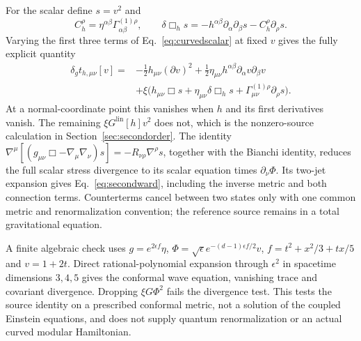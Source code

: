 \documentclass[12pt]{article}
\theoremstyle{definition}
\theoremstyle{remark}
\newcommand{\Glin}{G^{\mathrm{lin}}}
\begin{document}
For the scalar define $s=v^2$ and
\[
 C_h^\rho=\eta^{\alpha\beta}\Gamma^{(1)\rho}_{\alpha\beta},\qquad
 \delta\Box_h s=-h^{\alpha\beta}\partial_\alpha\partial_\beta s
                                      -C_h^\rho\partial_\rho s.
\]
Varying the first three terms of Eq.~\eqref{eq:curvedscalar} at fixed $v$
gives the fully explicit quantity
\begin{align*}
 \delta_g t_{h,\mu\nu}[v]={}&-\tfrac12h_{\mu\nu}(\partial v)^2
       +\tfrac12\eta_{\mu\nu}h^{\alpha\beta}
                                 \partial_\alpha v\partial_\beta v\\
 &+\xi\bigl(h_{\mu\nu}\Box s+\eta_{\mu\nu}\delta\Box_hs
                      +\Gamma^{(1)\rho}_{\mu\nu}\partial_\rho s\bigr).
\end{align*}
At a normal-coordinate point this vanishes when $h$ and its first
derivatives vanish. The remaining $\xi\Glin[h]v^2$ does not, which
is the nonzero-source calculation in Section~\ref{sec:secondorder}.
The identity
$\nabla^\mu[(g_{\mu\nu}\Box-\nabla_\mu\nabla_\nu)s]
=-R_{\nu\rho}\nabla^\rho s$, together with the Bianchi identity,
reduces the full scalar stress divergence to its scalar equation times
$\partial_\nu\Phi$. Its two-jet expansion gives
Eq.~\eqref{eq:secondward}, including the inverse metric and both connection
terms. Counterterms cancel between two states only with one common
metric and renormalization convention; the reference source remains
in a total gravitational equation.

A finite algebraic check uses
$g=e^{2\epsilon f}\eta$,
$\Phi=\sqrt\epsilon e^{-(d-1)\epsilon f/2}v$,
$f=t^2+x^2/3+tx/5$ and $v=1+2t$.
Direct rational-polynomial expansion through $\epsilon^2$ in spacetime
dimensions $3,4,5$ gives the conformal wave equation, vanishing trace
and covariant divergence. Dropping $\xi G\Phi^2$ fails the divergence
test. This tests the source identity on a prescribed conformal metric,
not a solution of the coupled Einstein equations, and does not supply
quantum renormalization or an actual curved modular Hamiltonian.
\end{document}
